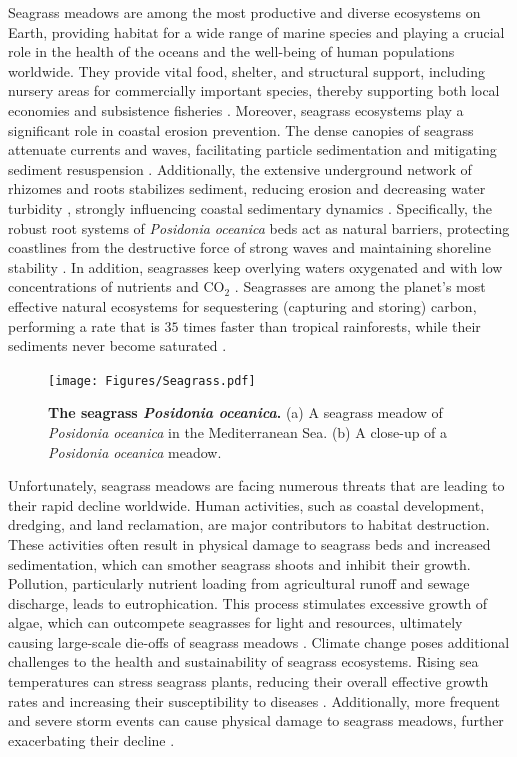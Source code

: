 Seagrass meadows are among the most productive and diverse ecosystems on
Earth,
providing habitat for a wide range of marine species \cite{Beck2001} and
playing a crucial role in the health of the oceans and the well-being of
human
populations worldwide. They provide vital food, shelter, and structural
support, including nursery areas for commercially important species,
thereby supporting both local economies and subsistence fisheries
\cite{Heck2003}. Moreover, seagrass ecosystems play a significant role in
coastal erosion prevention. The dense canopies of seagrass attenuate currents
and waves, facilitating particle sedimentation and mitigating sediment
resuspension \cite{Granata2001,Koch2006,Bos2007,Gacia2001}. Additionally, the
extensive underground network of rhizomes and roots stabilizes sediment,
reducing erosion and decreasing water turbidity \cite{Madsen2001}, strongly
influencing coastal sedimentary dynamics \cite{Marba2002,vanderHeide2007}.
Specifically, the robust root systems of \textit{Posidonia oceanica} beds act
as natural barriers, protecting coastlines from the destructive force of
strong
waves and maintaining shoreline stability
\cite{Fonseca1992,Sanchez-Gonzalez2011,vandeVijsel2023}. In addition,
seagrasses keep overlying
waters oxygenated and with low concentrations of nutrients and CO$_2$
\cite{DuarteChiscano1999}. Seagrasses are among the planet’s most effective
natural ecosystems for sequestering (capturing and storing) carbon, performing
a rate that is $35$ times faster than tropical rainforests, while their
sediments never become saturated \cite{Mcleod2011}.

\begin{figure}[H]
  \centering
  \texttt{[image: Figures/Seagrass.pdf]}
  \caption[The seagrass \textit{Posidonia oceanica}]{
    \textbf{The seagrass \textit{Posidonia oceanica}.} (a) A seagrass meadow
    of
    \textit{Posidonia oceanica} in the Mediterranean Sea. (b) A close-up of a
    \textit{Posidonia oceanica} meadow.}
  \label{fig:Posidonia}
\end{figure}

Unfortunately, seagrass meadows are facing numerous threats that are leading
to
their rapid decline worldwide. Human activities, such as coastal development,
dredging, and land reclamation, are major contributors to habitat
destruction.
These activities often result in physical damage to seagrass beds and
increased
sedimentation, which can smother seagrass shoots and inhibit their growth.
Pollution, particularly nutrient loading from agricultural runoff and sewage
discharge, leads to eutrophication. This process stimulates excessive growth
of
algae, which can outcompete seagrasses for light and resources, ultimately
causing large-scale die-offs of seagrass meadows \cite{Orth2006}. Climate
change
poses additional challenges to the health and sustainability of seagrass
ecosystems. Rising sea temperatures can stress seagrass plants, reducing
their
overall effective growth rates and increasing their susceptibility to
diseases
\cite{Waycott2009}. Additionally, more frequent and severe storm events can
cause physical damage to seagrass meadows, further exacerbating their
decline \cite{Bjork2008}.

